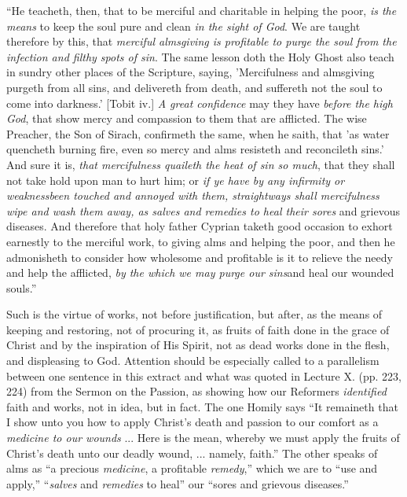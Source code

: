 ``He teacheth, then, that to be merciful and
charitable in helping the poor, \emph{is the means} to keep the soul
pure and clean \emph{in the sight of God}. We are taught therefore by
this, that \emph{merciful almsgiving is profitable to purge the soul from
the infection and filthy spots of sin}. The same lesson doth the
Holy Ghost also teach in sundry other places of the Scripture, saying,
'Mercifulness and almsgiving purgeth from all sins, and delivereth
from death, and suffereth not the soul to come into darkness.' [Tobit
iv.] \emph{A great confidence} may they have \emph{before the high God},
that show mercy and compassion to them that are afflicted. The wise
Preacher, the Son of Sirach, confirmeth the same, when he saith, that 'as water quencheth burning fire, even so mercy and alms resisteth
and reconcileth sins.' And sure it is, \emph{that mercifulness quaileth
the heat of sin so much}, that they shall not take hold upon man to
hurt him; or \emph{if ye have by any infirmity or weakness}\emph{been
touched and annoyed with them, straightways shall mercifulness wipe
and wash them away, as salves and remedies to heal their sores} and
grievous diseases. And therefore that holy father Cyprian taketh good
occasion to exhort earnestly to the merciful work, to giving alms and
helping the poor, and then he admonisheth to consider how wholesome
and profitable is it to relieve the needy and help the afflicted, \emph{by
the which we may purge our sins}and heal our wounded souls.''

Such is the virtue of works, not before
justification, but after, as the means of keeping and restoring, not
of procuring it, as fruits of faith done in the grace of Christ and by
the inspiration of His Spirit, not as dead works done in the flesh,
and displeasing to God. Attention should be especially called to a
parallelism between one sentence in this extract and what was quoted
in Lecture X. (pp. 223, 224) from the Sermon on the Passion, as
showing how our Reformers \emph{identified} faith and works, not in
idea, but in fact. The one Homily says ``It remaineth that I show
unto you how to apply Christ's death and passion to our comfort as a
\emph{medicine to our wounds} ... Here is
the mean, whereby we must apply the fruits of Christ's death unto
our deadly wound, ... namely, faith.'' The other speaks of alms as
``a precious \emph{medicine}, a profitable \emph{remedy},''
which we are to ``use and apply,'' ``\emph{salves} and \emph{remedies}
to heal'' our ``sores and grievous diseases.''

